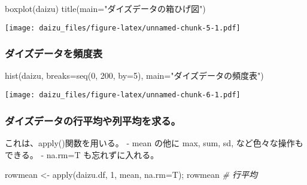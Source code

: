 \documentclass[
]{article}
\newenvironment{Shaded}{\begin{snugshade}}{\end{snugshade}}
\newcommand{\AttributeTok}[1]{\textcolor[rgb]{0.77,0.63,0.00}{#1}}
\newcommand{\CommentTok}[1]{\textcolor[rgb]{0.56,0.35,0.01}{\textit{#1}}}
\newcommand{\DecValTok}[1]{\textcolor[rgb]{0.00,0.00,0.81}{#1}}
\newcommand{\FunctionTok}[1]{\textcolor[rgb]{0.00,0.00,0.00}{#1}}
\newcommand{\NormalTok}[1]{#1}
\newcommand{\OtherTok}[1]{\textcolor[rgb]{0.56,0.35,0.01}{#1}}
\newcommand{\StringTok}[1]{\textcolor[rgb]{0.31,0.60,0.02}{#1}}
\begin{document}
\begin{Shaded}
\begin{Highlighting}[]
    \FunctionTok{boxplot}\NormalTok{(daizu)}
    \FunctionTok{title}\NormalTok{(}\AttributeTok{main=}\StringTok{"ダイズデータの箱ひげ図"}\NormalTok{)}
\end{Highlighting}
\end{Shaded}

\texttt{[image: daizu\_files/figure-latex/unnamed-chunk-5-1.pdf]}

\hypertarget{ux30c0ux30a4ux30baux30c7ux30fcux30bfux3092ux983bux5ea6ux8868}{%
\subsubsection{ダイズデータを頻度表}\label{ux30c0ux30a4ux30baux30c7ux30fcux30bfux3092ux983bux5ea6ux8868}}

\begin{Shaded}
\begin{Highlighting}[]
    \FunctionTok{hist}\NormalTok{(daizu, }\AttributeTok{breaks=}\FunctionTok{seq}\NormalTok{(}\DecValTok{0}\NormalTok{, }\DecValTok{200}\NormalTok{, }\AttributeTok{by=}\DecValTok{5}\NormalTok{), }\AttributeTok{main=}\StringTok{"ダイズデータの頻度表"}\NormalTok{)}
\end{Highlighting}
\end{Shaded}

\texttt{[image: daizu\_files/figure-latex/unnamed-chunk-6-1.pdf]}

\hypertarget{ux30c0ux30a4ux30baux30c7ux30fcux30bfux306eux884cux5e73ux5747ux3084ux5217ux5e73ux5747ux3092ux6c42ux308b}{%
\subsubsection{ダイズデータの行平均や列平均を求る。}\label{ux30c0ux30a4ux30baux30c7ux30fcux30bfux306eux884cux5e73ux5747ux3084ux5217ux5e73ux5747ux3092ux6c42ux308b}}

これは、apply()関数を用いる。 - mean の他に max, sum, sd,
など色々な操作もできる。 - na.rm=T も忘れずに入れる。

\begin{Shaded}
\begin{Highlighting}[]
\NormalTok{    rowmean }\OtherTok{\textless{}{-}} \FunctionTok{apply}\NormalTok{(daizu.df, }\DecValTok{1}\NormalTok{, mean, }\AttributeTok{na.rm=}\NormalTok{T); rowmean       }\CommentTok{\# 行平均}
\end{Highlighting}
\end{Shaded}
\end{document}
